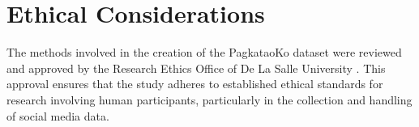 


%
%

\section{Ethical Considerations}
\label{sec:Ethics}

The methods involved in the creation of the PagkataoKo dataset were reviewed and approved by the Research Ethics Office of De La Salle University \citep{Tighe_Acorda_Agno_Gano_Go_Santiago_Sedillo_2022}. This approval ensures that the study adheres to established ethical standards for research involving human participants, particularly in the collection and handling of social media data.

